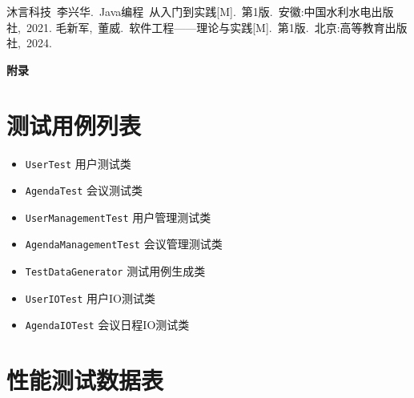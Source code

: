 \documentclass[a4paper, twoside, utf8]{ctexart}
\begin{document}
    \begin{thebibliography}{99}
         沐言科技\ 李兴华.\ Java编程\ 从入门到实践[M].\ 第1版.\ 安徽:中国水利水电出版社,\ 2021.
         毛新军,\ 董威.\ 软件工程——理论与实践[M].\ 第1版.\ 北京:高等教育出版社,\ 2024.
    \end{thebibliography}
	
	\newpage
	\appendix
	\centerline{\Large{\textbf{附录}}}

    \section{测试用例列表}

    \begin{itemize}[itemsep=2pt, topsep=0pt, parsep=0pt]
        \item \verb|UserTest| \quad 用户测试类
        \item \verb|AgendaTest| \quad 会议测试类
        \item \verb|UserManagementTest| \quad 用户管理测试类
        \item \verb|AgendaManagementTest| \quad 会议管理测试类
        \item \verb|TestDataGenerator| \quad 测试用例生成类
        \item \verb|UserIOTest| \quad 用户IO测试类
        \item \verb|AgendaIOTest| \quad 会议日程IO测试类
    \end{itemize}

    \section{性能测试数据表}
\end{document}
